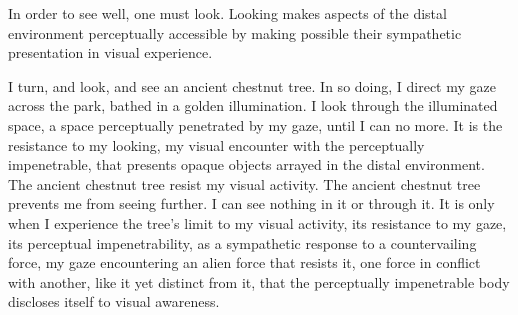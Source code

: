 In order to see well, one must look. Looking makes aspects of the distal environment perceptually accessible by making possible their sympathetic presentation in visual experience.

I turn, and look, and see an ancient chestnut tree. In so doing, I direct my gaze across the park, bathed in a golden illumination. I look through the illuminated space, a space perceptually penetrated by my gaze, until I can no more. It is the resistance to my looking, my visual encounter with the perceptually impenetrable, that presents opaque objects arrayed in the distal environment. The ancient chestnut tree resist my visual activity. The ancient chestnut tree prevents me from seeing further. I can see nothing in it or through it. It is only when I experience the tree's limit to my visual activity, its resistance to my gaze, its perceptual impenetrability, as a sympathetic response to a countervailing force, my gaze encountering an alien force that resists it, one force in conflict with another, like it yet distinct from it, that the perceptually impenetrable body discloses itself to visual awareness.




